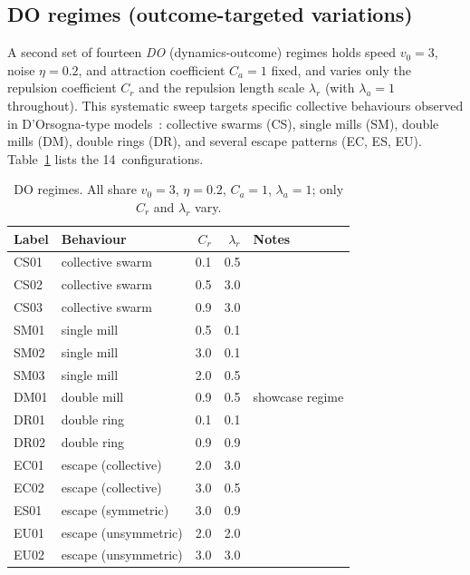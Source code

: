 \documentclass{report}
\theoremstyle{plain}
\theoremstyle{remark}
\numberwithin{equation}{section}              %
\begin{document}
\subsection{DO regimes (outcome-targeted variations)}
\label{subsec:do_regimes}

A second set of fourteen \emph{DO} (dynamics-outcome) regimes holds speed
$v_0{=}3$, noise $\eta{=}0.2$, and attraction coefficient $C_a{=}1$ fixed, and
varies only the repulsion coefficient $C_r$ and the repulsion length scale
$\lambda_r$ (with $\lambda_a{=}1$ throughout).  This systematic sweep targets
specific collective behaviours observed in D'Orsogna-type
models~\cite{dorsogna2006morse}: collective swarms (CS), single mills (SM), double
mills (DM), double rings (DR), and several escape patterns (EC, ES, EU).
Table~\ref{tab:do_regimes} lists the 14~configurations.

\begin{table}[ht!]
\centering
\caption{DO regimes.  All share $v_0{=}3$, $\eta{=}0.2$, $C_a{=}1$,
  $\lambda_a{=}1$; only $C_r$ and $\lambda_r$ vary.}
\label{tab:do_regimes}
\footnotesize
\begin{tabular}{llrrl}
\hline
Label & Behaviour & $C_r$ & $\lambda_r$ & Notes \\
\hline
CS01 & collective swarm    & 0.1 & 0.5 & \\
CS02 & collective swarm    & 0.5 & 3.0 & \\
CS03 & collective swarm    & 0.9 & 3.0 & \\
SM01 & single mill         & 0.5 & 0.1 & \\
SM02 & single mill         & 3.0 & 0.1 & \\
SM03 & single mill         & 2.0 & 0.5 & \\
DM01 & double mill         & 0.9 & 0.5 & showcase regime \\
DR01 & double ring         & 0.1 & 0.1 & \\
DR02 & double ring         & 0.9 & 0.9 & \\
EC01 & escape (collective) & 2.0 & 3.0 & \\
EC02 & escape (collective) & 3.0 & 0.5 & \\
ES01 & escape (symmetric)  & 3.0 & 0.9 & \\
EU01 & escape (unsymmetric)& 2.0 & 2.0 & \\
EU02 & escape (unsymmetric)& 3.0 & 3.0 & \\
\hline
\end{tabular}
\end{table}
\end{document}
